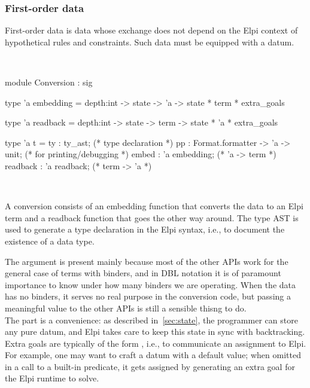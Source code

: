 \documentclass[a4paper, 11pt]{book}
\newenvironment{ocamlcode}
  {\VerbatimEnvironment~\\\begin{ocamlbox}\begin{xocamlcode}}{\end{xocamlcode}
\end{ocamlbox}\\}
\begin{document}



  

\subsubsection{First-order data}\label{sec:fodata}\label{sec:opaquedata}

First-order data is data whose exchange does not depend on the Elpi context of
hypothetical rules and constraints. Such data must be equipped with a
 datum.

\begin{ocamlcode}
module Conversion : sig

type 'a embedding =
  depth:int ->
  state -> 'a -> state * term * extra_goals

type 'a readback =
  depth:int ->
  state -> term -> state * 'a * extra_goals

type 'a t = {
  ty : ty_ast;                         (* type declaration *)
  pp : Format.formatter -> 'a -> unit; (* for printing/debugging *)
  embed : 'a embedding;                (* 'a -> term *)
  readback : 'a readback;              (* term -> 'a *)
}
\end{ocamlcode}

\noindent
A conversion consists of an embedding function that converts the data to an
Elpi term and a readback function that goes the other way around. The type AST
 is used to generate a type declaration in the Elpi syntax, i.e.,
to document the existence of a data type.


The  argument is present mainly because most of the other APIs
work for the general case of terms with binders, and in DBL notation it is of
paramount importance to know under how many binders we are operating. When the
data has no binders, it serves no real purpose in the conversion code, but
passing a meaningful value to the other APIs is still a sensible thisng to do.\\
The  part is a convenience: as described in~\cref{sec:state},
the programmer can store any pure datum, and Elpi takes care to keep this
state in sync with backtracking.\\
Extra goals are typically of the form , i.e., to communicate an
assignment to Elpi. For example, one may want to craft a datum with a default
value; when omitted in a call to a built-in predicate, it gets assigned by
generating an extra goal for the Elpi runtime to solve.
\end{document}
